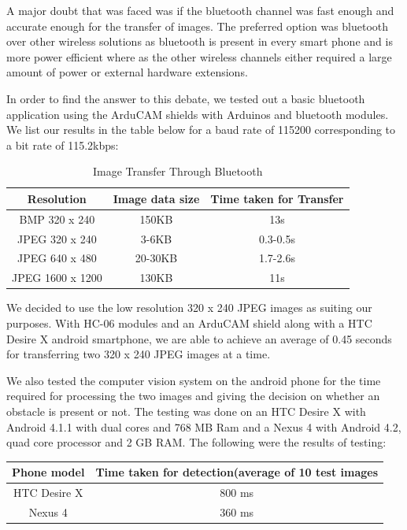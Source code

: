\documentclass[11pt]{report}
\begin{document}
{{A major doubt that was faced was if the bluetooth channel was fast enough and accurate enough for the transfer of images. The preferred option was bluetooth over other wireless solutions as bluetooth is present in every smart phone and is more power efficient where as the other wireless channels either required a large amount of power or external hardware extensions.

In order to find the answer to this debate, we tested out a basic bluetooth application using the ArduCAM shields with Arduinos and bluetooth modules. We list our results in the table below for a baud rate of 115200 corresponding to a bit rate of 115.2kbps: 
\newline
\begin{table}[h]
\begin{tabular}{|c|c|c|}
\hline
Resolution & Image data size & Time taken for Transfer\\
\hline
BMP 320 x 240 & 150KB & 13s\\
\hline
JPEG 320 x 240 &	 3-6KB &	0.3-0.5s\\
\hline
JPEG 640 x 480 &	 20-30KB &	1.7-2.6s\\
\hline
JPEG 1600 x 1200 & 	130KB  &  11s\\
\hline

\end{tabular} 
\caption{Image Transfer Through Bluetooth}
\end{table}
\newline

We decided to use the low resolution 320 x 240 JPEG images as suiting our purposes. With HC-06 modules and an ArduCAM shield along with a HTC Desire X android smartphone, we are able to achieve an average of 0.45 seconds for transferring two 320 x 240 JPEG images at a time.

We also tested the computer vision system on the android phone for the time required for processing the two images and giving the decision on whether an obstacle is present or not. The testing was done on an HTC Desire X with Android 4.1.1 with dual cores and 768 MB Ram and a Nexus 4 with Android 4.2, quad core processor and 2 GB RAM. The following were the results of testing:

\begin{table}[h]
\begin{tabular}{|c|c|}
\hline
Phone model & Time taken for detection(average of 10 test images\\
\hline
HTC Desire X & 800 ms\\
\hline
Nexus 4 & 360 ms\\
\hline


\end{tabular}
\end{table}}}
\end{document}
